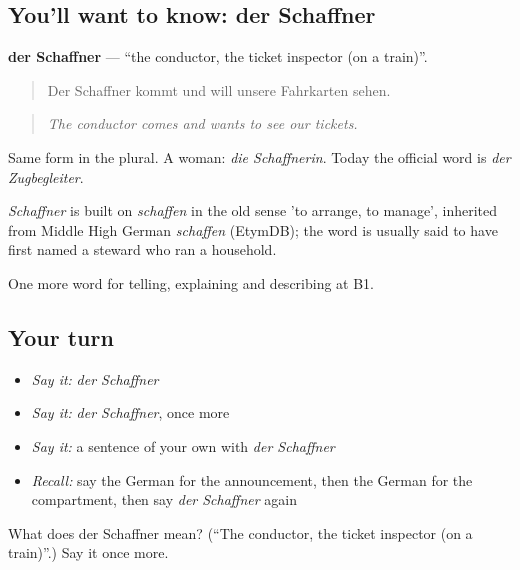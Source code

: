 \subsection*{You'll want to know: der Schaffner}
\textbf{der Schaffner} — \textquotedblleft{}the conductor, the ticket inspector (on a train)\textquotedblright{}.

\begin{quote}
Der Schaffner kommt und will unsere Fahrkarten sehen.
\end{quote}

\begin{quote}
\emph{The conductor comes and wants to see our tickets.}
\end{quote}

Same form in the plural. A woman: \emph{die Schaffnerin}. Today the official word is \emph{der Zugbegleiter}.

\begin{cousinweb}
\emph{Schaffner} is built on \emph{schaffen} in the old sense 'to arrange, to manage', inherited from Middle High German \emph{schaffen} (EtymDB); the word is usually said to have first named a steward who ran a household.
\end{cousinweb}

\begin{grammarlens}[title={What you've built}]
One more word for telling, explaining and describing at B1.
\end{grammarlens}

\subsection*{Your turn}
\begin{itemize}
\raggedright
  \item \emph{Say it:} \emph{der Schaffner}
  \item \emph{Say it:} \emph{der Schaffner}, once more
  \item \emph{Say it:} a sentence of your own with \emph{der Schaffner}
  \item \emph{Recall:} say the German for the announcement, then the German for the compartment, then say \emph{der Schaffner} again
\end{itemize}

\begin{tcolorbox}[breakable,colback=teal!4,colframe=teal!35!black,title={Before you move on}]
What does der Schaffner mean? (\textquotedblleft{}The conductor, the ticket inspector (on a train)\textquotedblright{}.) Say it once more.
\end{tcolorbox}
